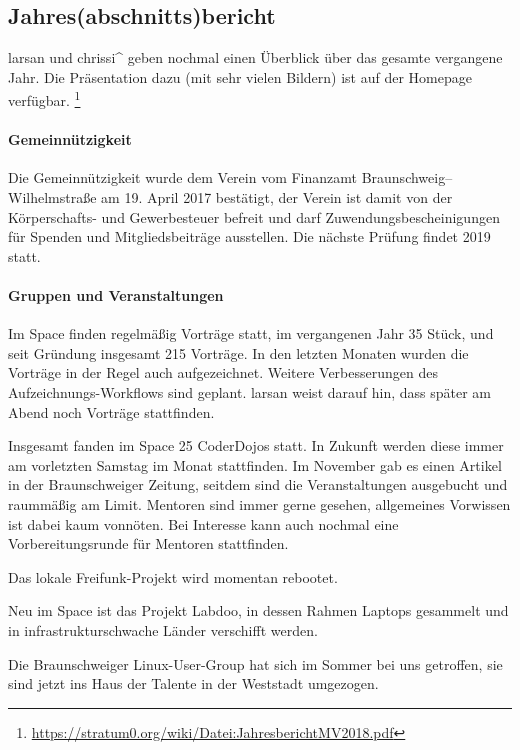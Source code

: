 \documentclass{s0minutes}
\begin{document}
\subsection{Jahres(abschnitts)bericht}

larsan und chrissi\^{} geben nochmal einen Überblick über das gesamte vergangene
Jahr. Die Präsentation dazu (mit sehr vielen Bildern) ist auf der Homepage
verfügbar.%
\footnote{\url{https://stratum0.org/wiki/Datei:JahresberichtMV2018.pdf}}

\paragraph{Gemeinnützigkeit}

Die Gemeinnützigkeit wurde dem Verein vom Finanzamt Braunschweig--Wilhelmstraße
am 19. April 2017 bestätigt, der Verein ist damit von der Körperschafts- und
Gewerbesteuer befreit und darf Zuwendungsbescheinigungen für Spenden und
Mitglieds\-beiträge ausstellen.  Die nächste Prüfung findet 2019 statt.

\paragraph{Gruppen und Veranstaltungen}

Im Space finden regelmäßig Vorträge statt, im vergangenen Jahr 35 Stück, und
seit Gründung insgesamt 215 Vorträge. In den letzten Monaten wurden die
Vorträge in der Regel auch aufgezeichnet. Weitere Verbesserungen des
Aufzeichnungs-Workflows sind geplant. larsan weist darauf hin, dass später am
Abend noch Vorträge stattfinden.

Insgesamt fanden im Space 25 CoderDojos statt. In Zukunft werden diese immer am
vorletzten Samstag im Monat stattfinden. Im November gab es einen Artikel
in der Braunschweiger Zeitung, seitdem sind die Veranstaltungen ausgebucht und
raummäßig am Limit. Mentoren sind immer gerne gesehen, allgemeines Vorwissen ist
dabei kaum vonnöten. Bei Interesse kann auch nochmal eine Vorbereitungsrunde für
Mentoren stattfinden.

Das lokale Freifunk-Projekt wird momentan rebootet.

Neu im Space ist das Projekt Labdoo, in dessen Rahmen Laptops gesammelt und in
infrastrukturschwache Länder verschifft werden.

Die Braunschweiger Linux-User-Group hat sich im Sommer bei uns getroffen, sie
sind jetzt ins Haus der Talente in der Weststadt umgezogen.
\end{document}
